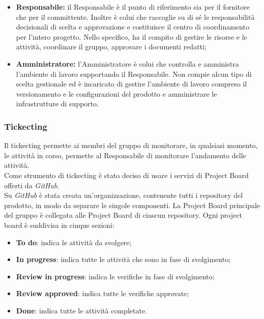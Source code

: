 \begin{itemize}
   				\item \textbf{Responsabile:} il Responsabile è il punto di riferimento sia per il fornitore che per il committente. Inoltre è colui che raccoglie su di sé le responsabilità decisionali di scelta e approvazione e costituisce il centro di coordinamento per l'intero progetto. Nello specifico, ha il compito di gestire le risorse e le attività, coordinare il gruppo, approvare i documenti redatti;
   				\item \textbf{Amministratore:} l'Amministratore è colui che controlla e amministra l'ambiente di lavoro supportando il Responsabile. Non compie alcun tipo di scelta gestionale ed è incaricato di gestire  l'ambiente di lavoro compreso il versionamento e le configurazioni del prodotto e amministrare le infrastrutture di supporto.
   			\end{itemize}
   		
   		\subsubsection{Tickecting}
   		Il tickecting permette ai membri del gruppo di monitorare, in qualsiasi momento, le attività in corso, permette al Responsabile di monitorare l'andamento delle attività.\\   		
   		\noindent Come strumento di tickecting è stato deciso di usare i servizi di Project Board offerti da \textit{GitHub\glos}.\\   		
   		Su \textit{GitHub\glo} è stata creata un'organizzazione, contenente tutti i repository del prodotto, in modo da separare le singole componenti.
   		La Project Board principale del gruppo è collegata alle Project Board di ciascun repository.
   		Ogni project board è suddivisa in cinque sezioni:
   		\begin{itemize}
   			\item \textbf{To do}: indica le attività da svolgere;
   			\item \textbf{In progress}: indica tutte le attività che sono in fase di svolgimento;
   			\item \textbf{Review in progress}: indica le verifiche in fase di svolgimento;
   			\item \textbf{Review approved}: indica tutte le verifiche approvate;
   			\item \textbf{Done}: indica tutte le attività completate.
   		\end{itemize}
%   		
%   		
